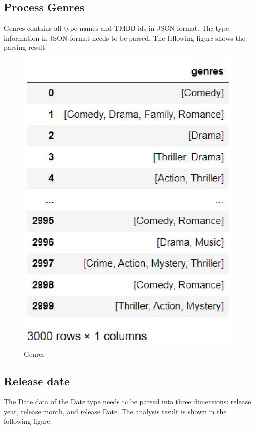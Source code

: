 \subsection{Process Genres}
Genres contains all type names and TMDB ids in JSON format.
The type information in JSON format needs to be parsed. 
The following figure shows the parsing result. \\

\begin{figure}[htbp]
  \includegraphics[scale=0.5]{./figures/genres.eps}
  \caption{Genres}
\end{figure}


\subsection{Release date}
The Date data of the Date type needs to be parsed into three dimensions: release year,
release month, and release Date. 
The analysis result is shown in the following figure. \\

